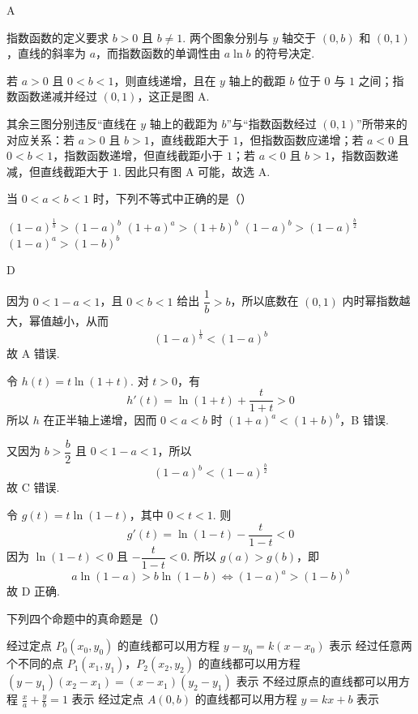\documentclass[UTF8,a4paper,oneside,11pt]{ctexbook}
\begin{document}
\begin{answer}
A
\end{answer}

\begin{solution}
指数函数的定义要求 \(b>0\) 且 \(b\ne1\). 两个图象分别与 \(y\) 轴交于 \((0,b)\) 和 \((0,1)\)，直线的斜率为 \(a\)，而指数函数的单调性由 \(a\ln b\) 的符号决定.

若 \(a>0\) 且 \(0<b<1\)，则直线递增，且在 \(y\) 轴上的截距 \(b\) 位于 \(0\) 与 \(1\) 之间；指数函数递减并经过 \((0,1)\)，这正是图 A.

其余三图分别违反“直线在 \(y\) 轴上的截距为 \(b\)”与“指数函数经过 \((0,1)\)”所带来的对应关系：若 \(a>0\) 且 \(b>1\)，直线截距大于 \(1\)，但指数函数应递增；若 \(a<0\) 且 \(0<b<1\)，指数函数递增，但直线截距小于 \(1\)；若 \(a<0\) 且 \(b>1\)，指数函数递减，但直线截距大于 \(1\). 因此只有图 A 可能，故选 A.
\end{solution}

\begin{problem}
当 \(0<a<b<1\) 时，下列不等式中正确的是（\quad）

\choices
    {\((1 - a)^{\frac{1}{b}} > (1 - a)^{b}\)}
    {\((1 + a)^{a} > (1 + b)^{b}\)}
    {\((1 - a)^{b} > (1 - a)^{\frac{b}{2}}\)}
    {\((1 - a)^{a} > (1 - b)^{b}\)}
\end{problem}

\begin{answer}
D
\end{answer}

\begin{solution}
因为 \(0<1-a<1\)，且 \(0<b<1\) 给出 \(\dfrac1b>b\)，所以底数在 \((0,1)\) 内时幂指数越大，幂值越小，从而
\[
(1-a)^{\frac{1}{b}}<(1-a)^b
\]
故 A 错误.

令 \(h(t)=t\ln(1+t)\). 对 \(t>0\)，有
\[
h'(t)=\ln(1+t)+\frac{t}{1+t}>0
\]
所以 \(h\) 在正半轴上递增，因而 \(0<a<b\) 时 \((1+a)^a<(1+b)^b\)，B 错误.

又因为 \(b>\dfrac b2\) 且 \(0<1-a<1\)，所以
\[
(1-a)^b<(1-a)^{\frac{b}{2}}
\]
故 C 错误.

令 \(g(t)=t\ln(1-t)\)，其中 \(0<t<1\). 则
\[
g'(t)=\ln(1-t)-\frac{t}{1-t}<0
\]
因为 \(\ln(1-t)<0\) 且 \(-\dfrac{t}{1-t}<0\). 所以 \(g(a)>g(b)\)，即
\[
a\ln(1-a)>b\ln(1-b)
\iff (1-a)^a>(1-b)^b
\]
故 D 正确.
\end{solution}

\begin{problem}
下列四个命题中的真命题是（\quad）

\choices
    {经过定点 \(P_0(x_0,y_0)\) 的直线都可以用方程 \(y-y_0=k(x-x_0)\) 表示}
    {经过任意两个不同的点 \(P_1(x_1,y_1)\)，\(P_2(x_2,y_2)\) 的直线都可以用方程 \((y-y_1)(x_2-x_1)=(x-x_1)(y_2-y_1)\) 表示}
    {不经过原点的直线都可以用方程 \(\frac{x}{a}+\frac{y}{b}=1\) 表示}
    {经过定点 \(A(0,b)\) 的直线都可以用方程 \(y=kx+b\) 表示}
\end{problem}
\end{document}
